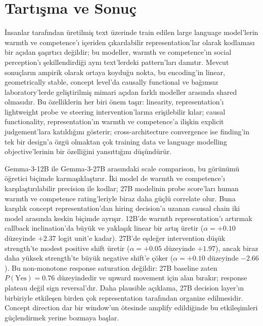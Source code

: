 \documentclass[twocolumn]{article}
\begin{document}
\section*{Tartışma ve Sonuç}

İnsanlar tarafından üretilmiş text üzerinde train edilen large language
model'lerin warmth ve competence'ı içeriden çıkarılabilir representation'lar
olarak kodlaması bir açıdan şaşırtıcı değildir; bu modeller, warmth ve
competence'ın social perception'ı şekillendirdiği aynı text'lerdeki pattern'ları
damıtır. Mevcut sonuçların ampirik olarak ortaya koyduğu nokta, bu encoding'in
linear, geometrically stable, concept level'da causally functional ve bağımsız
laboratory'lerde geliştirilmiş mimari açıdan farklı modeller arasında shared
olmasıdır. Bu özelliklerin her biri önem taşır: linearity, representation'ı
lightweight probe ve steering intervention'larına erişilebilir kılar; causal
functionality, representation'ın warmth ve competence'a ilişkin explicit
judgement'lara katıldığını gösterir; cross-architecture convergence ise
finding'in tek bir design'a özgü olmaktan çok training data ve language
modelling objective'lerinin bir özelliğini yansıttığını düşündürür.

Gemma-3-12B ile Gemma-3-27B arasındaki scale comparison, bu görünümü öğretici
biçimde karmaşıklaştırır. İki model de warmth ve competence'ı karşılaştırılabilir
precision ile kodlar; 27B modelinin probe score'ları human warmth ve competence
rating'leriyle biraz daha güçlü correlate olur. Buna karşılık concept
representation'dan hiring decision'a uzanan causal chain iki model arasında
keskin biçimde ayrışır. 12B'de warmth representation'ı artırmak callback
inclination'da büyük ve yaklaşık linear bir artış üretir ($\alpha = +0.10$
düzeyinde $+2.37$ logit unit'e kadar). 27B'de eşdeğer intervention düşük
strength'te modest positive shift üretir ($\alpha = +0.05$ düzeyinde $+1.97$),
ancak biraz daha yüksek strength'te büyük negative shift'e çöker
($\alpha = +0.10$ düzeyinde $-2.66$). Bu non-monotone response saturation
değildir: 27B baseline zaten $P(\text{Yes}) = 0.76$ düzeyindedir ve upward
movement için alan bırakır; response plateau değil sign reversal'dır. Daha
plausible açıklama, 27B decision layer'ın birbiriyle etkileşen birden çok
representation tarafından organize edilmesidir. Concept direction dar bir
window'un ötesinde amplify edildiğinde bu etkileşimleri güçlendirmek yerine
bozmaya başlar.
\end{document}
